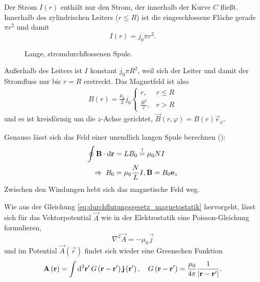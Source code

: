 Der Strom $I\left(r\right)$ enthält nur den Strom, der innerhalb der Kurve $C$ fließt. Innerhalb des zylindrischen Leiters ($r\leq R$) ist die eingeschlossene Fläche gerade $\pi r^{2}$ und damit
\begin{equation*}
	I\left(r\right)=j_{0}\pi r^{2}.
\end{equation*}


\begin{figure}[htb]
	\centering
	\tfigCoil
	\caption{Lange, stromdurchflossenen Spule. }
	\label{fig:long_coil_scheme}
\end{figure}

Außerhalb des Leiters ist $I$ konstant $j_{0}\pi R^{2}$, weil sich der Leiter und damit der Stromfluss nur bis $r=R$ erstreckt. Das Magnetfeld ist also
\begin{align*}
	B\left(r\right)=\frac{\mu _{0}}{2}j_{0}\begin{cases} r,               & r\leq R \\
              \frac{R^{2}}{r}, & r>R
	                                       \end{cases}
\end{align*}
und es ist kreisförmig um die $z$-Achse gerichtet, $\vec {B}\left(r,\varphi \right)=B\left(r\right)\vec {e}_{\varphi }$.

Genauso lässt sich das Feld einer unendlich langen Spule berechnen ():
\begin{align*}
	\oint \vec {B}\cdot \diff \vec {r} & =LB_{0}\overset{!}{=}\mu _{0}NI                   \\
	\implication B_{0}                 & =\mu _{0}\frac{N}{L}I, \vec {B}=B_{0}\vec {e}_{z}
\end{align*}
Zwischen den Windungen hebt sich das magnetische Feld weg.

Wie aus der Gleichung \eqref{eq:durchflutungsgesetz_magnetostatik} hervorgeht, lässt sich für das Vektorpotential $\vec {A}$ wie in der Elektrostatik eine Poisson-Gleichung formulieren,
\begin{equation*}
	\nabla ^{2}\vec {A}=-\mu _{0}\vec {j}
\end{equation*}
und im Potential $\vec {A}\left(\vec {r}\right)$ findet sich wieder eine Greenschen Funktion
\begin{equation*}
	\vec {A}\left(\vec {r}\right)=\int \diffa[3]{\vec{r}'}G\left(\vec {r}-\vec {r}'\right)\vec {j}\left(\vec {r}'\right),\quad G\left(\vec {r}-\vec {r}'\right)=\frac{\mu _{0}}{4\pi }\frac{1}{\left| \vec {r}-\vec {r}'\right| }.
\end{equation*}


